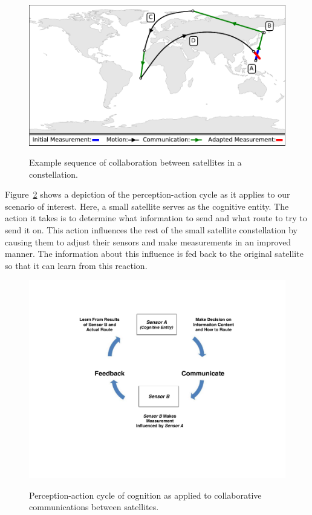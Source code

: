\documentclass[conference]{IEEEtran}
\begin{document}
\begin{figure}[b!]
  \begin{center}
    \includegraphics[width=0.9\linewidth] {images/collaborate.pdf} \\
  \end{center}
  \caption{Example sequence of collaboration between satellites in a constellation.}
  \label{fig:figureColab}
\end{figure}

Figure~\ref{fig:figure2} shows a depiction of the perception-action cycle as it
applies to our scenario of interest.  Here, a small satellite serves as the
cognitive entity.  The action it takes is to determine what information to send
and what route to try to send it on.  This action influences the rest of the
small satellite constellation by causing them to adjust their sensors and make
measurements in an improved manner.  The information about this influence is fed
back to the original satellite so that it can learn from this reaction.


\begin{figure}[b!]
  \begin{center}
    \includegraphics[width=0.9\linewidth] {images/Figure2.pdf} \\
  \end{center}
  \caption{Perception-action cycle of cognition as applied to collaborative communications between satellites.}
  \label{fig:figure2}
\end{figure}
\end{document}
